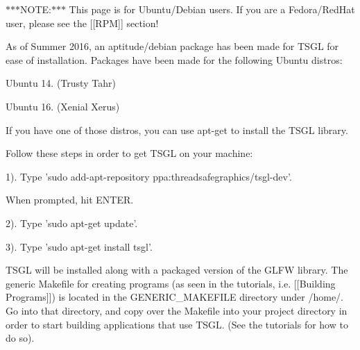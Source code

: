 $\ast$$\ast$$\ast$\-N\-O\-T\-E\-:$\ast$$\ast$$\ast$ This page is for Ubuntu/\-Debian users. If you are a Fedora/\-Red\-Hat user, please see the \mbox{[}\mbox{[}R\-P\-M\mbox{]}\mbox{]} section!

As of Summer 2016, an aptitude/debian package has been made for T\-S\-G\-L for ease of installation. Packages have been made for the following Ubuntu distros\-:
\begin{DoxyItemize}
\item Ubuntu 14. (Trusty Tahr)
\item Ubuntu 16. (Xenial Xerus)
\end{DoxyItemize}

If you have one of those distros, you can use apt-\/get to install the T\-S\-G\-L library.

Follow these steps in order to get T\-S\-G\-L on your machine\-:

1). Type 'sudo add-\/apt-\/repository ppa\-:threadsafegraphics/tsgl-\/dev'.
\begin{DoxyItemize}
\item When prompted, hit E\-N\-T\-E\-R.
\end{DoxyItemize}

2). Type 'sudo apt-\/get update'.

3). Type 'sudo apt-\/get install tsgl'.

T\-S\-G\-L will be installed along with a packaged version of the G\-L\-F\-W library. The generic Makefile for creating programs (as seen in the tutorials, i.\-e. \mbox{[}\mbox{[}Building Programs\mbox{]}\mbox{]}) is located in the G\-E\-N\-E\-R\-I\-C\-\_\-\-M\-A\-K\-E\-F\-I\-L\-E directory under /home/. Go into that directory, and copy over the Makefile into your project directory in order to start building applications that use T\-S\-G\-L. (See the tutorials for how to do so). 